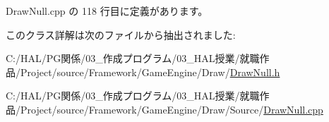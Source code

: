  Draw\+Null.\+cpp の 118 行目に定義があります。



このクラス詳解は次のファイルから抽出されました\+:\begin{DoxyCompactItemize}
\item 
C\+:/\+H\+A\+L/\+P\+G関係/03\+\_\+作成プログラム/03\+\_\+\+H\+A\+L授業/就職作品/\+Project/source/\+Framework/\+Game\+Engine/\+Draw/\mbox{\hyperlink{_draw_null_8h}{Draw\+Null.\+h}}\item 
C\+:/\+H\+A\+L/\+P\+G関係/03\+\_\+作成プログラム/03\+\_\+\+H\+A\+L授業/就職作品/\+Project/source/\+Framework/\+Game\+Engine/\+Draw/\+Source/\mbox{\hyperlink{_draw_null_8cpp}{Draw\+Null.\+cpp}}\end{DoxyCompactItemize}
